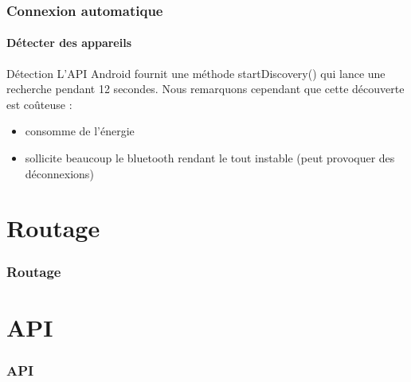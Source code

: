 \documentclass{beamer}
\begin{document}
    \begin{frame}
      \frametitle{Connexion automatique}
      \framesubtitle{Détecter des appareils}
      \begin{block}{Détection}
        L'API Android fournit une méthode startDiscovery() qui lance une recherche pendant 12 secondes. Nous remarquons cependant que cette découverte est coûteuse :
        \begin{itemize}
          \item consomme de l'énergie
          \item sollicite beaucoup le bluetooth rendant le tout instable (peut provoquer des déconnexions)
        \end{itemize}
      \end{block}
    \end{frame}
  
  \section{Routage}
  \begin{frame}
    \frametitle{Routage}
    \framesubtitle{}
  
  \end{frame}
  
  \section{API}
  \begin{frame}
    \frametitle{API}
    \framesubtitle{}
  
  \end{frame}
  
  
\end{document}
